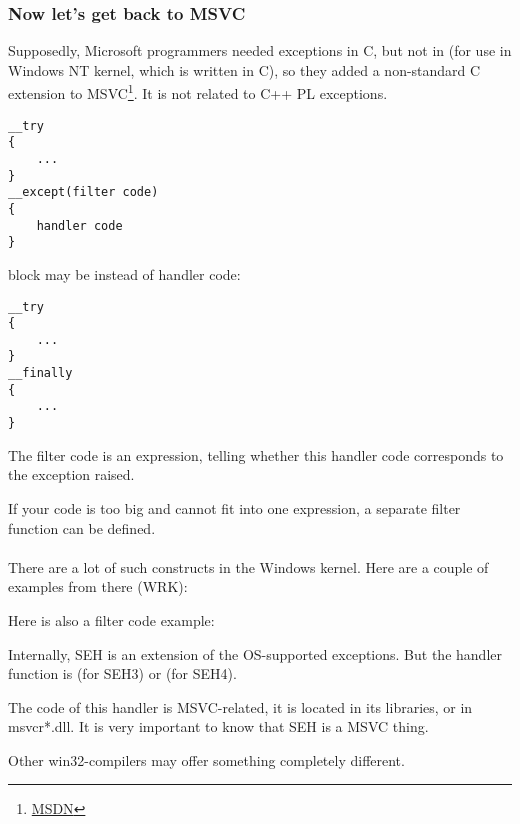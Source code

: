 \subsubsection{Now let's get back to MSVC}


Supposedly, Microsoft programmers needed exceptions in C, but not in \Cpp (for use in Windows NT kernel, which is written in C),
so they added a non-standard C extension
to MSVC\footnote{\href{http://go.yurichev.com/17057}{MSDN}}.
It is not related to C++ \ac{PL} exceptions.

\begin{lstlisting}[style=customc]
__try
{
    ...
}
__except(filter code)
{
    handler code
}
\end{lstlisting}

 block may be instead of handler code:

\begin{lstlisting}[style=customc]
__try
{
    ...
}
__finally
{
    ...
}
\end{lstlisting}


The filter code is an expression, telling whether this handler code corresponds to the exception raised.

If your code is too big and cannot fit into one expression, a separate filter function can be defined.\\
\\
There are a lot of such constructs in the Windows kernel.
Here are a couple of examples from there (\ac{WRK}):





Here is also a filter code example:



Internally, SEH is an extension of the OS-supported exceptions.
But the handler function is  (for SEH3) or  (for SEH4).

The code of this handler is MSVC-related, it is located in its libraries, or in msvcr*.dll.
It is very important to know that SEH is a MSVC thing.

Other win32-compilers may offer something completely different.

